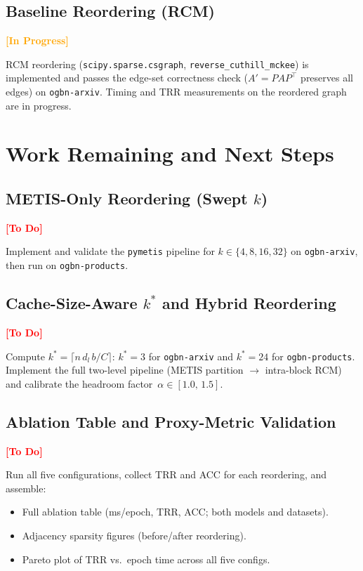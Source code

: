\documentclass[sigconf,review]{acmart}
\newcommand{\inprogress}{\textcolor{orange}{\textbf{[In Progress]}}}
\newcommand{\todo}{\textcolor{red}{\textbf{[To Do]}}}
\begin{document}
\subsection{Baseline Reordering (RCM)} \inprogress

RCM reordering (\texttt{scipy.sparse.csgraph},
\texttt{reverse\_cuthill\_mckee}) is implemented and passes the
edge-set correctness check ($A' = PAP^\top$ preserves all edges)
on \texttt{ogbn-arxiv}.
Timing and TRR measurements on the reordered graph are in progress.

\section{Work Remaining and Next Steps}

\subsection{METIS-Only Reordering (Swept $k$)} \todo

Implement and validate the \texttt{pymetis} pipeline for
$k \in \{4, 8, 16, 32\}$ on \texttt{ogbn-arxiv}, then run on
\texttt{ogbn-products}.

\subsection{Cache-Size-Aware $k^*$ and Hybrid Reordering} \todo

Compute $k^* = \lceil n\,d_l\,b / C\rceil$: $k^*\!=\!3$ for
\texttt{ogbn-arxiv} and $k^*\!=\!24$ for \texttt{ogbn-products}.
Implement the full two-level pipeline (METIS partition $\to$ intra-block RCM)
and calibrate the headroom factor~$\alpha \in [1.0,\,1.5]$.

\subsection{Ablation Table and Proxy-Metric Validation} \todo

Run all five configurations, collect TRR and ACC for each reordering,
and assemble:
\begin{itemize}[noitemsep]
    \item Full ablation table (ms/epoch, TRR, ACC; both models and datasets).
    \item Adjacency sparsity figures (before/after reordering).
    \item Pareto plot of TRR vs.\ epoch time across all five configs.
\end{itemize}
\end{document}
